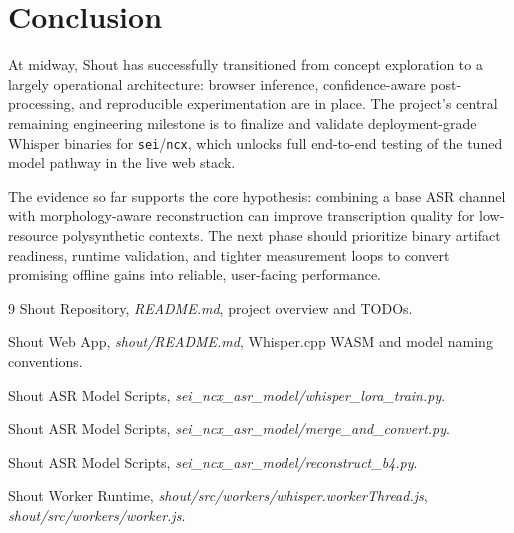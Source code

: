 \documentclass[11pt]{article}
\begin{document}
\section{Conclusion}
At midway, Shout has successfully transitioned from concept exploration to a largely operational architecture: browser inference, confidence-aware post-processing, and reproducible experimentation are in place. The project's central remaining engineering milestone is to finalize and validate deployment-grade Whisper binaries for \texttt{sei}/\texttt{ncx}, which unlocks full end-to-end testing of the tuned model pathway in the live web stack.

The evidence so far supports the core hypothesis: combining a base ASR channel with morphology-aware reconstruction can improve transcription quality for low-resource polysynthetic contexts. The next phase should prioritize binary artifact readiness, runtime validation, and tighter measurement loops to convert promising offline gains into reliable, user-facing performance.

\begin{thebibliography}{9}
Shout Repository, \textit{README.md}, project overview and TODOs.

Shout Web App, \textit{shout/README.md}, Whisper.cpp WASM and model naming conventions.

Shout ASR Model Scripts, \textit{sei\_ncx\_asr\_model/whisper\_lora\_train.py}.

Shout ASR Model Scripts, \textit{sei\_ncx\_asr\_model/merge\_and\_convert.py}.

Shout ASR Model Scripts, \textit{sei\_ncx\_asr\_model/reconstruct\_b4.py}.

Shout Worker Runtime, \textit{shout/src/workers/whisper.workerThread.js}, \textit{shout/src/workers/worker.js}.
\end{thebibliography}
\end{document}
